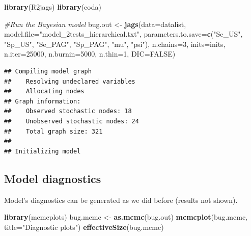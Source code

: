 \documentclass[
]{book}
\newenvironment{Shaded}{\begin{snugshade}}{\end{snugshade}}
\newcommand{\AttributeTok}[1]{\textcolor[rgb]{0.13,0.29,0.53}{#1}}
\newcommand{\CommentTok}[1]{\textcolor[rgb]{0.56,0.35,0.01}{\textit{#1}}}
\newcommand{\ConstantTok}[1]{\textcolor[rgb]{0.56,0.35,0.01}{#1}}
\newcommand{\DecValTok}[1]{\textcolor[rgb]{0.00,0.00,0.81}{#1}}
\newcommand{\FunctionTok}[1]{\textcolor[rgb]{0.13,0.29,0.53}{\textbf{#1}}}
\newcommand{\NormalTok}[1]{#1}
\newcommand{\OtherTok}[1]{\textcolor[rgb]{0.56,0.35,0.01}{#1}}
\newcommand{\StringTok}[1]{\textcolor[rgb]{0.31,0.60,0.02}{#1}}
\begin{document}
\begin{Shaded}
\begin{Highlighting}[]
\FunctionTok{library}\NormalTok{(R2jags)}
\FunctionTok{library}\NormalTok{(coda)}

\CommentTok{\#Run the Bayesian model}
\NormalTok{bug.out }\OtherTok{\textless{}{-}} \FunctionTok{jags}\NormalTok{(}\AttributeTok{data=}\NormalTok{datalist,                             }
                \AttributeTok{model.file=}\StringTok{"model\_2tests\_hierarchical.txt"}\NormalTok{,     }
                \AttributeTok{parameters.to.save=}\FunctionTok{c}\NormalTok{(}\StringTok{"Se\_US"}\NormalTok{, }\StringTok{"Sp\_US"}\NormalTok{, }\StringTok{"Se\_PAG"}\NormalTok{, }\StringTok{"Sp\_PAG"}\NormalTok{,}
                                     \StringTok{"mu"}\NormalTok{, }\StringTok{"psi"}\NormalTok{),               }
                \AttributeTok{n.chains=}\DecValTok{3}\NormalTok{,                                 }
                \AttributeTok{inits=}\NormalTok{inits,                                }
                \AttributeTok{n.iter=}\DecValTok{25000}\NormalTok{,                                }
                \AttributeTok{n.burnin=}\DecValTok{5000}\NormalTok{,                              }
                \AttributeTok{n.thin=}\DecValTok{1}\NormalTok{,                                   }
                \AttributeTok{DIC=}\ConstantTok{FALSE}\NormalTok{)  }
\end{Highlighting}
\end{Shaded}

\begin{verbatim}
## Compiling model graph
##    Resolving undeclared variables
##    Allocating nodes
## Graph information:
##    Observed stochastic nodes: 18
##    Unobserved stochastic nodes: 24
##    Total graph size: 321
## 
## Initializing model
\end{verbatim}

\subsection{Model diagnostics}\label{model-diagnostics}

Model's diagnostics can be generated as we did before (results not shown).

\begin{Shaded}
\begin{Highlighting}[]
\FunctionTok{library}\NormalTok{(mcmcplots)}
\NormalTok{bug.mcmc }\OtherTok{\textless{}{-}} \FunctionTok{as.mcmc}\NormalTok{(bug.out)          }
\FunctionTok{mcmcplot}\NormalTok{(bug.mcmc, }\AttributeTok{title=}\StringTok{"Diagnostic plots"}\NormalTok{) }
\FunctionTok{effectiveSize}\NormalTok{(bug.mcmc)}
\end{Highlighting}
\end{Shaded}
\end{document}
